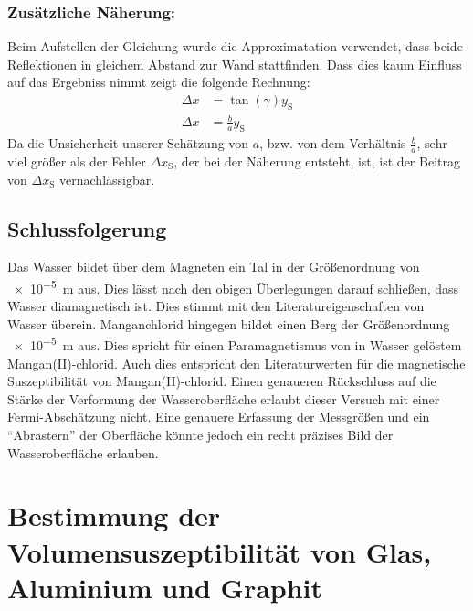 \documentclass[
	a4paper,
	12pt,
	pagesize,
	ngerman
]{scrartcl}
\begin{document}
	\subsubsection*{Zusätzliche Näherung:}
	Beim Aufstellen der Gleichung wurde die Approximatation verwendet, dass beide Reflektionen in gleichem Abstand zur Wand stattfinden. Dass dies kaum Einfluss auf das Ergebniss nimmt zeigt die folgende Rechnung:
	\begin{align*}
		\Delta x &= \tan (\gamma) y_\text{S} \\
		\Delta x &= \frac{b}{a} y_\text{S}
	\end{align*}
	Da die Unsicherheit unserer Schätzung von $a$, bzw. von dem Verhältnis $\frac{b}{a}$, sehr viel größer als der Fehler $\Delta x_\text{S}$, der bei der Näherung entsteht, ist, ist der Beitrag von $\Delta x_\text{S}$ vernachlässigbar.

	\subsection{Schlussfolgerung}
	Das Wasser bildet über dem Magneten ein Tal in der Größenordnung von \SI{e-5}{m} aus. Dies lässt nach den obigen Überlegungen darauf schließen, dass Wasser diamagnetisch ist. Dies stimmt mit den Literatureigenschaften von Wasser überein.
	Manganchlorid hingegen bildet einen Berg der Größenordnung \SI{e-5}{m} aus. Dies spricht für einen Paramagnetismus von in Wasser gelöstem Mangan(II)-chlorid. Auch dies entspricht den Literaturwerten für die magnetische Suszeptibilität von Mangan(II)-chlorid. Einen genaueren Rückschluss auf die Stärke der Verformung der Wasseroberfläche erlaubt dieser Versuch mit einer Fermi-Abschätzung nicht. Eine genauere Erfassung der Messgrößen und ein \enquote{Abrastern} der Oberfläche könnte jedoch ein recht präzises Bild der Wasseroberfläche erlauben.
	
	\section{Bestimmung der Volumensuszeptibilität von Glas, Aluminium und Graphit}
\end{document}
